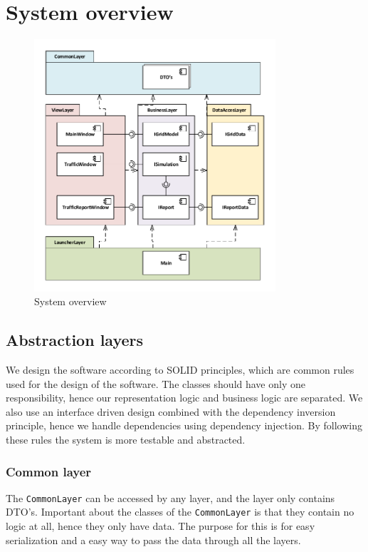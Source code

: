 \section{System overview}
\begin{figure}[!ht]
	\centering
	\includegraphics[width=0.8\textwidth]{figures/architecture}
	\caption{System overview}
	\label{fig:sys}
\end{figure}

\subsection{Abstraction layers}
We design the software according to SOLID principles, which are common rules used for the design of the software. The classes should have only one responsibility, hence our representation logic and business logic are separated. We also use an interface driven design combined with the dependency inversion principle, hence we handle dependencies using dependency injection. By following these rules the system is more testable and abstracted. 

\subsubsection{Common layer}
The \texttt{CommonLayer} can be accessed by any layer, and the layer only contains DTO's. Important about the classes of the \texttt{CommonLayer} is that they contain no logic at all, hence they only have data. The purpose for this is for easy serialization and a easy way to pass the data through all the layers.

